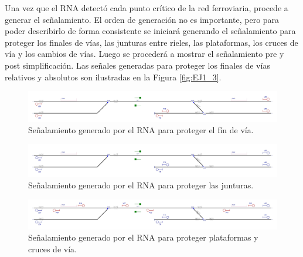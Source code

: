 	Una vez que el RNA detectó cada punto crítico de la red ferroviaria, procede a generar el señalamiento. El orden de generación no es importante, pero para poder describirlo de forma consistente se iniciará generando el señalamiento para proteger los finales de vías, las junturas entre rieles, las plataformas, los cruces de vía y los cambios de vías. Luego se procederá a mostrar el señalamiento pre y post simplificación. Las señales generadas para proteger los finales de vías relativos y absolutos son ilustradas en la Figura \ref{fig:EJ1_3}.

	\begin{figure}[H]
		\centering
		\includegraphics[width=1\textwidth]{resultados-obtenidos/ejemplo2/images/2_step1.png}
		\centering\caption{Señalamiento generado por el RNA para proteger el fín de vía.}
		\label{fig:EJ2_3}
	\end{figure}









\lipsum[1]

\begin{figure}[H]
	\centering
	\includegraphics[width=1\textwidth]{resultados-obtenidos/ejemplo2/images/2_step2.png}
	\centering\caption{Señalamiento generado por el RNA para proteger las junturas.}
\end{figure}

\lipsum[1]

\begin{figure}[H]
	\centering
	\includegraphics[width=1\textwidth]{resultados-obtenidos/ejemplo2/images/2_step3.png}
	\centering\caption{Señalamiento generado por el RNA para proteger plataformas y cruces de vía.}
\end{figure}


